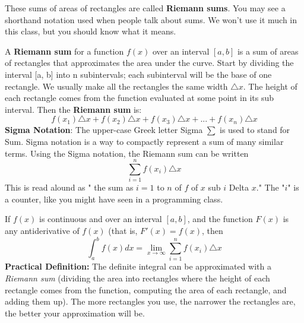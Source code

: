 \noindent These sums of areas of rectangles are called \textbf{Riemann sums}. You may see a shorthand notation used when people talk about sums. We won’t use it much in this class, but you should know what it means.
\newpage
\begin{tcolorbox}[title = {Riemann Sum}]
A \textbf{Riemann sum} for a function $f(x)$ over an interval $[a, b]$ is a sum of areas of rectangles that approximates the area under the curve. Start by dividing the interval [a, b] into n subintervals; each subinterval will be the base of one rectangle. We usually make all the rectangles the same width $\triangle x$. The height of each rectangle comes from the function evaluated at some point in its sub interval. Then the \textbf{Riemann sum} is:
\vspace*{-0.5cm}
\begin{equation}\label{eq:riemann}
    f(x_1)\triangle x+f(x_2)\triangle x+f(x_3)\triangle x+...+f(x_n)\triangle x
\end{equation}
\textbf{Sigma Notation}: The upper-case Greek letter Sigma $\sum$ is used to stand for Sum. Sigma notation is a way to compactly represent a sum of many similar terms. Using the Sigma notation, the Riemann sum can be written
\vspace*{-0.5cm}
\begin{equation}\label{eq:riemannSigma}
    \sum_{i=1}^{n} f(x_i)\triangle x 
\end{equation}
This is read alound as " the sum as $i=1$ to $n$ of $f$ of $x$ sub $i$ Delta $x$." The "$i$" is a counter, like you might have seen in a programming class.
\end{tcolorbox}

\begin{tcolorbox}[title = {Formal Definition of Definite Integral and Riemann Sum}]
\noindent If $f(x)$ is continuous and  over an interval $[a,b]$, and the function $F(x)$ is any antiderivative of $f(x)$ (that is, $F'(x)=f(x)$, then 
\begin{equation}\label{defIntgRiemann}
    \int_{a}^{b} f(x) dx=\lim_{x\to\infty}\sum_{i=1}^{n} f(x_i)\triangle x 
\end{equation}
\textbf{Practical Definition: }The definite integral can be approximated with a \emph{Riemann sum} (dividing the area into rectangles where the height of each rectangle comes from the function, computing the area of each rectangle, and adding them up). The more rectangles you use, the narrower the rectangles are, the better your approximation will be.
\end{tcolorbox}


